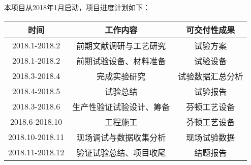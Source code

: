 本项目从2018年1月启动，项目进度计划如下：\par
\begin{tabular}{|c|c|c|}
\hline
时间 & 工作内容 & 可交付性成果\\
\hline
2018.1-2018.2 & 前期文献调研与工艺研究 & 试验方案\\
\hline
2018.1-2018.2 & 前期试验设备、材料准备 & 试验设备\\
\hline
2018.3-2018.4 & 完成实验研究 & 试验数据汇总分析\\
\hline
2018.4-2018.5 & 试验总结 & 试验报告\\
\hline
2018.3-2018.6 & 生产性验证试验设计、筹备 & 芬顿工艺设备\\
\hline
2018.6-2018.10 & 工程施工 & 芬顿工艺设备\\
\hline
2018.10-2018.11 & 现场调试与数据收集分析 & 现场试验数据\\
\hline
2018.11-2018.12 & 验证试验总结、项目收尾 & 结题报告\\
\hline
\end{tabular}
\par